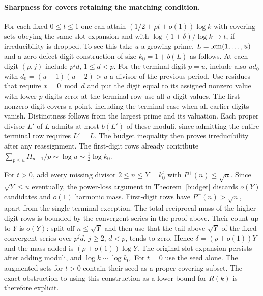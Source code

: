 \documentclass[10pt]{article}
\newcommand{\lp}{P^+}
\newcommand{\lcm}{\mathop{\rm lcm}}
\begin{document}
\paragraph{Sharpness for covers retaining the matching condition.}
For each fixed $0\le t\le1$ one can attain $(1/2+\rho t+o(1))\log k$ with covering sets obeying the same slot expansion and with $\log(1+\delta)/\log k\to t$, if irreducibility is dropped. To see this take $u$ a growing prime, $L=\lcm(1,\ldots,u)$ and a zero-defect digit construction of size $k_0=1+b(L)$ as follows. At each digit $(p,j)$ include $p^j d$, $1\le d<p$. For the terminal digit $p=u$, include also $ud_0$ with $d_0=(u-1)(u-2)>u$ a divisor of the previous period. Use residues that require $x=0\bmod d$ and put the digit equal to its assigned nonzero value with lower $p$-digits zero; at the terminal row use all $u$ digit values. The first nonzero digit covers a point, including the terminal case when all earlier digits vanish. Distinctness follows from the largest prime and its valuation. Each proper divisor $L'$ of $L$ admits at most $b(L')$ of these moduli, since admitting the entire terminal row requires $L'=L$. The budget inequality then proves irreducibility after any reassignment. The first-digit rows already contribute $\sum_{p\le u}H_{p-1}/p\sim\log u\sim\frac12\log k_0$.

For $t>0$, add every missing divisor $2\le n\le Y=k_0^t$ with $\lp(n)\le\sqrt n$. Since $\sqrt Y\le u$ eventually, the power-loss argument in Theorem~\ref{budget} discards $o(Y)$ candidates and $o(1)$ harmonic mass. First-digit rows have $\lp(n)>\sqrt n$, apart from the single terminal exception. The total reciprocal mass of the higher-digit rows is bounded by the convergent series in the proof above. Their count up to $Y$ is $o(Y)$: split off $n\le\sqrt Y$ and then use that the tail above $\sqrt Y$ of the fixed convergent series over $p^j d$, $j\ge2,\,d<p$, tends to zero. Hence $\delta=(\rho+o(1))Y$ and the mass added is $(\rho+o(1))\log Y$. The original slot expansion persists after adding moduli, and $\log k\sim\log k_0$. For $t=0$ use the seed alone. The augmented sets for $t>0$ contain their seed as a proper covering subset. The exact obstruction to using this construction as a lower bound for $R(k)$ is therefore explicit.
\end{document}
